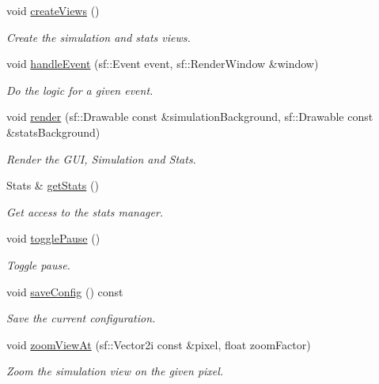 \begin{DoxyCompactItemize}
void \hyperlink{class_application_a243bb0cf151bdaa9bc16e06498964cf6}{create\-Views} ()
\begin{DoxyCompactList}\small\item\em Create the simulation and stats views. \end{DoxyCompactList}\item 
void \hyperlink{class_application_aaac48a5982dd7c72f727f917347b07aa}{handle\-Event} (sf\-::\-Event event, sf\-::\-Render\-Window \&window)
\begin{DoxyCompactList}\small\item\em Do the logic for a given event. \end{DoxyCompactList}\item 
void \hyperlink{class_application_af3a3bba5fac5920c26ddb4ccd3ae69fa}{render} (sf\-::\-Drawable const \&simulation\-Background, sf\-::\-Drawable const \&stats\-Background)
\begin{DoxyCompactList}\small\item\em Render the G\-U\-I, Simulation and Stats. \end{DoxyCompactList}\item 
Stats \& \hyperlink{class_application_a9d9d5670dfd9ca54b4c39bb9b870d106}{get\-Stats} ()
\begin{DoxyCompactList}\small\item\em Get access to the stats manager. \end{DoxyCompactList}\item 
void \hyperlink{class_application_af03097cece8f7dbbe744bd7a242af033}{toggle\-Pause} ()
\begin{DoxyCompactList}\small\item\em Toggle pause. \end{DoxyCompactList}\item 
void \hyperlink{class_application_aed88c8943b8df942461e99c226d5bee2}{save\-Config} () const 
\begin{DoxyCompactList}\small\item\em Save the current configuration. \end{DoxyCompactList}\item 
void \hyperlink{class_application_aeecb0f55acec51532399693799d19fe7}{zoom\-View\-At} (sf\-::\-Vector2i const \&pixel, float zoom\-Factor)
\begin{DoxyCompactList}\small\item\em Zoom the simulation view on the given pixel. \end{DoxyCompactList}\item 

\end{DoxyCompactItemize}
